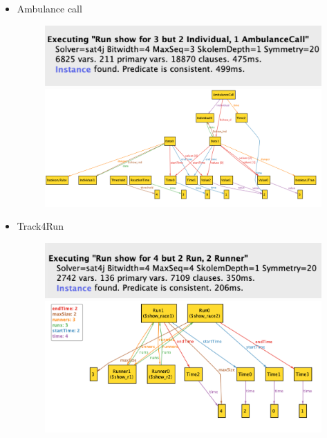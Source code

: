 \documentclass{article}
\begin{document}
\begin{legal}
\begin{itemize}
\begin{figure}[H]
			\end{figure}
			\item Ambulance call
			\begin{figure}[H]
		  				\includegraphics[width=\linewidth]{./images/alloy/automatedSOS-Run.png}
		  				\includegraphics[width=\linewidth]{./images/alloy/automatedSOS-World.png}
			\end{figure}
			\newpage
			\item Track4Run
			\begin{figure}[H]
		  				\includegraphics[width=\linewidth]{./images/alloy/track4Run-Run.png}
		  				\includegraphics[width=\linewidth]{./images/alloy/track4Run-World.png}
			\end{figure}
		\end{itemize}

\end{legal}
\end{document}
